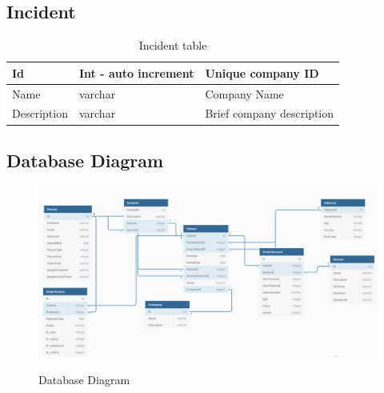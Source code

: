 \subsection{Incident}

\begin{table}[!ht]
\begin{center}
\begin{tabular}{ |l|l|l| } 
 \hline
Id & Int - auto increment & Unique company ID \\
 \hline
Name & varchar & Company Name \\
 \hline
Description & varchar & Brief company description \\
 \hline
\end{tabular}
\end{center}
    \caption{Incident table}
\end{table}


\subsection{Database Diagram}
\begin{figure}[!ht]
	\centering
	\includegraphics[width=1\textwidth]{images/IOSLDBDiagramlatex.png}\\
	\caption{Database Diagram}
	\label{fig:Database Diagram}
\end{figure}
